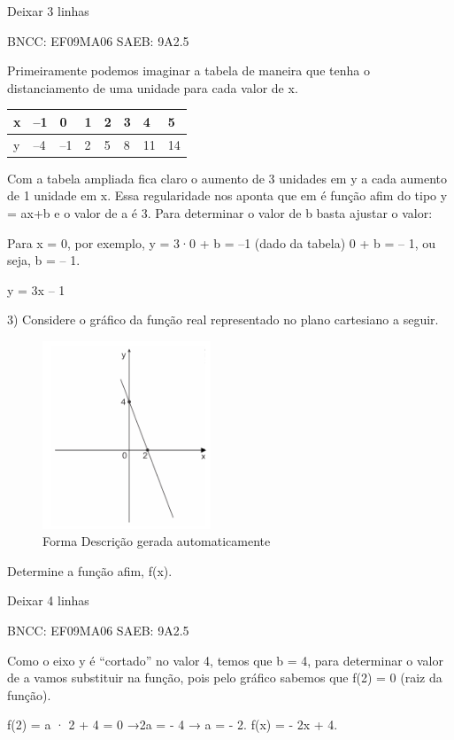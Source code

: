 \begin{escolha}
{{{\begin{escolha}
{{{Deixar 3 linhas

BNCC: EF09MA06 SAEB: 9A2.5

Primeiramente podemos imaginar a tabela de maneira que tenha o
distanciamento de uma unidade para cada valor de x.

\begin{longtable}[]{@{}llllllll@{}}
\toprule\noalign{}
x & --1 & 0 & 1 & 2 & 3 & 4 & 5 \\
\midrule\noalign{}
\endhead
\bottomrule\noalign{}
\endlastfoot
y & --4 & --1 & 2 & 5 & 8 & 11 & 14 \\
\end{longtable}

Com a tabela ampliada fica claro o aumento de 3 unidades em y a cada
aumento de 1 unidade em x. Essa regularidade nos aponta que em é função
afim do tipo y = ax+b e o valor de a é 3. Para determinar o valor de b
basta ajustar o valor:

Para x = 0, por exemplo, y = 3·0 + b = --1 (dado da tabela) 0 + b = --
1, ou seja, b = -- 1.

y = 3x -- 1

3) Considere o gráfico da função real representado no plano cartesiano a
seguir.

\begin{figure}
\centering
\includegraphics[width=1.97543in,height=2.20513in]{./_SAEB_9_MAT/media/image137.png}
\caption{Forma Descrição gerada automaticamente}
\end{figure}

Determine a função afim, f(x).

Deixar 4 linhas

BNCC: EF09MA06 SAEB: 9A2.5

Como o eixo y é ``cortado'' no valor 4, temos que b = 4, para determinar
o valor de a vamos substituir na função, pois pelo gráfico sabemos que
f(2) = 0 (raiz da função).

f(2) = a · 2 + 4 = 0 →2a = - 4 → a = - 2. f(x) = - 2x + 4.

}}}
\end{escolha}}}}
\end{escolha}
